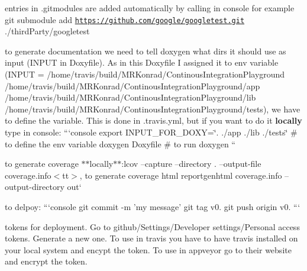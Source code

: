 \begin{DoxyItemize}
\item entries in {\ttfamily .gitmodules} are added automatically by calling in console for example {\ttfamily git submodule add \href{https://github.com/google/googletest.git}{\tt https\-://github.\-com/google/googletest.\-git} ./third\-Party/googletest}
\begin{DoxyItemize}
\item to generate documentation we need to tell doxygen what dirs it should use as input ({\ttfamily I\-N\-P\-U\-T} in Doxyfile). As in this Doxyfile I assigned it to env variable ({\ttfamily I\-N\-P\-U\-T = /home/travis/build/\-M\-R\-Konrad/\-Continous\-Integration\-Playground /home/travis/build/\-M\-R\-Konrad/\-Continous\-Integration\-Playground/app /home/travis/build/\-M\-R\-Konrad/\-Continous\-Integration\-Playground/lib /home/travis/build/\-M\-R\-Konrad/\-Continous\-Integration\-Playground/tests}), we have to define the variable. This is done in {\ttfamily .travis.\-yml}, but if you want to do it {\bfseries locally} type in console\-: ```console export I\-N\-P\-U\-T\-\_\-\-F\-O\-R\-\_\-\-D\-O\-X\-Y=\char`\"{}. ./app ./lib ./tests\char`\"{} \# to define the env variable doxygen Doxyfile \# to run doxygen ``{\ttfamily }
\end{DoxyItemize}
\item {\ttfamily to generate coverage $\ast$$\ast$locally$\ast$$\ast$\-:}lcov --capture --directory . --output-\/file coverage.\-info$<$tt$>$, to generate coverage html reportgenhtml coverage.\-info --output-\/directory out`
\item to delpoy\-: ```console git commit -\/m 'my message' git tag v0. git push origin v0. ```
\item tokens for deployment. Go to github/\-Settings/\-Developer settings/\-Personal access tokens. Generate a new one. To use in travis you have to have travis installed on your local system and encypt the token. To use in appveyor go to their website and encrypt the token. 
\end{DoxyItemize}